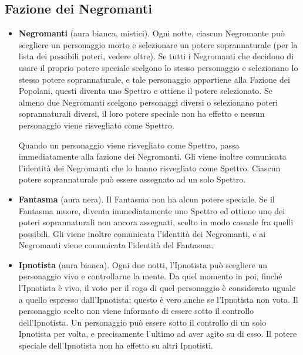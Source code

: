 \documentclass[a4paper,10pt]{article}
\begin{document}
\subsection*{Fazione dei Negromanti}
\label{negromanti}
\begin{itemize}

 \item {\bf Negromanti} (aura bianca, mistici). Ogni notte, ciascun Negromante può scegliere un personaggio morto e selezionare un potere soprannaturale (per la lista dei possibili poteri, vedere oltre). Se tutti i Negromanti che decidono di usare il proprio potere speciale scelgono lo stesso personaggio e selezionano lo stesso potere soprannaturale, e tale personaggio appartiene alla Fazione dei Popolani, questi diventa uno Spettro e ottiene il potere selezionato. Se almeno due Negromanti scelgono personaggi diversi o selezionano poteri soprannaturali diversi, il loro potere speciale non ha effetto e nessun personaggio viene risvegliato come Spettro.
 
 Quando un personaggio viene risvegliato come Spettro, passa immediatamente alla fazione dei Negromanti. Gli viene inoltre comunicata l'identità dei Negromanti che lo hanno risvegliato come Spettro. Ciascun potere soprannaturale può essere assegnato ad un solo Spettro.
 
 

 
 \item {\bf Fantasma} (aura nera). Il Fantasma non ha alcun potere speciale. Se il Fantasma muore, diventa immediatamente uno Spettro ed ottiene uno dei poteri soprannaturali non ancora assegnati, scelto in modo casuale fra quelli possibili. Gli viene inoltre comunicata l'identità dei Negromanti, e ai Negromanti viene comunicata l'identità del Fantasma.
 
 \item {\bf Ipnotista} (aura bianca). Ogni due notti, l'Ipnotista può scegliere un personaggio vivo e controllarne la mente. Da quel momento in poi, finché l'Ipnotista è vivo, il voto per il rogo di quel personaggio è considerato uguale a quello espresso dall'Ipnotista; questo è vero anche se l'Ipnotista non vota.
 Il personaggio scelto non viene informato di essere sotto il controllo dell'Ipnotista. Un personaggio può essere sotto il controllo di un solo Ipnotista per volta, e precisamente l'ultimo ad aver agito su di esso.
 Il potere speciale dell'Ipnotista non ha effetto su altri Ipnotisti.
 

\end{itemize}
\end{document}
